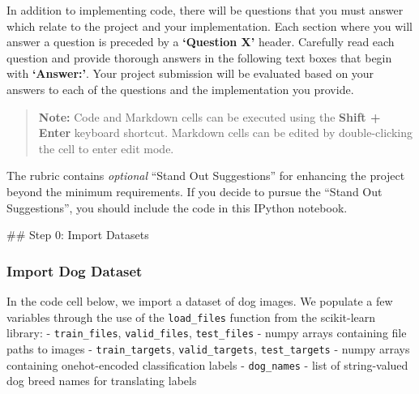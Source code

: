 \documentclass[11pt]{article}
\begin{document}
In addition to implementing code, there will be questions that you must
answer which relate to the project and your implementation. Each section
where you will answer a question is preceded by a \textbf{`Question X'}
header. Carefully read each question and provide thorough answers in the
following text boxes that begin with \textbf{`Answer:'}. Your project
submission will be evaluated based on your answers to each of the
questions and the implementation you provide.

\begin{quote}
\textbf{Note:} Code and Markdown cells can be executed using the
\textbf{Shift + Enter} keyboard shortcut. Markdown cells can be edited
by double-clicking the cell to enter edit mode.
\end{quote}

The rubric contains \emph{optional} ``Stand Out Suggestions'' for
enhancing the project beyond the minimum requirements. If you decide to
pursue the ``Stand Out Suggestions'', you should include the code in
this IPython notebook.

 \#\# Step 0: Import Datasets

\hypertarget{import-dog-dataset}{%
\subsubsection{Import Dog Dataset}\label{import-dog-dataset}}

In the code cell below, we import a dataset of dog images. We populate a
few variables through the use of the \texttt{load\_files} function from
the scikit-learn library: - \texttt{train\_files},
\texttt{valid\_files}, \texttt{test\_files} - numpy arrays containing
file paths to images - \texttt{train\_targets}, \texttt{valid\_targets},
\texttt{test\_targets} - numpy arrays containing onehot-encoded
classification labels - \texttt{dog\_names} - list of string-valued dog
breed names for translating labels
\end{document}
